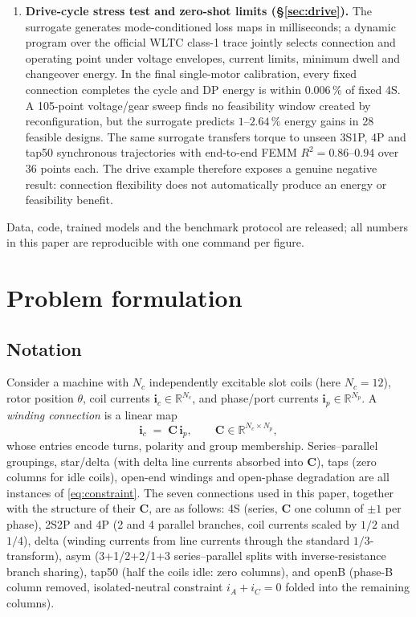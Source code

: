 \documentclass[review]{elsarticle}
\newcommand{\ic}{\boldsymbol{i}_c}
\newcommand{\ip}{\boldsymbol{i}_p}
\newcommand{\Cmat}{\boldsymbol{C}}
\begin{document}
\begin{enumerate}
that magnitude patterns cannot ($1.48\!\to\!0.066$).
Coverage \emph{kind} dominates coverage \emph{amount}; both
principles replicate on a 6-slot/4-pole second machine.
\item \textbf{Drive-cycle stress test and zero-shot limits
(\S\ref{sec:drive}).} The surrogate
generates mode-conditioned loss maps in milliseconds; a dynamic program over
the official WLTC class-1 trace jointly selects connection and operating
point under voltage envelopes, current limits, minimum dwell and changeover
energy. In the final single-motor calibration, every fixed connection
completes the cycle and DP energy is within $0.006\,\%$ of fixed 4S. A 105-point
voltage/gear sweep finds no feasibility window created by reconfiguration,
but the surrogate predicts $1$--$2.64\,\%$ energy gains in 28 feasible
designs.
The same surrogate transfers torque to unseen 3S1P, 4P and tap50
synchronous trajectories with end-to-end FEMM $R^2=0.86$--$0.94$ over 36
points each. The drive example therefore exposes a genuine negative result:
connection flexibility does not automatically produce an energy or
feasibility benefit.
\end{enumerate}

Data, code, trained models and the benchmark protocol are released; all
numbers in this paper are reproducible with one command per figure.

\section{Problem formulation}
\label{sec:formulation}

\subsection{Notation}

Consider a machine with $N_c$ independently excitable slot coils (here
$N_c=12$), rotor position $\theta$, coil currents $\ic\in\mathbb{R}^{N_c}$,
and phase/port currents $\ip\in\mathbb{R}^{N_p}$. A \emph{winding connection}
is a linear map
\begin{equation}
\ic \;=\; \Cmat\,\ip,\qquad \Cmat\in\mathbb{R}^{N_c\times N_p},
\label{eq:constraint}
\end{equation}
whose entries encode turns, polarity and group membership. Series--parallel
groupings, star/delta (with delta line currents absorbed into $\Cmat$),
taps (zero columns for idle coils), open-end windings and open-phase
degradation are all instances of \eqref{eq:constraint}. The seven
connections used in this paper, together with the structure of their
$\Cmat$, are as follows: 4S (series, $\Cmat$ one column of $\pm1$ per phase), 2S2P and 4P
(2 and 4 parallel branches, coil currents scaled by $1/2$ and $1/4$),
delta (winding currents from line currents through the standard
$1/3$-transform), asym (3+1/2+2/1+3 series--parallel splits with
inverse-resistance branch sharing), tap50 (half the coils idle: zero
columns), and openB (phase-B column removed, isolated-neutral constraint
$i_A+i_C=0$ folded into the remaining columns).
\end{document}
